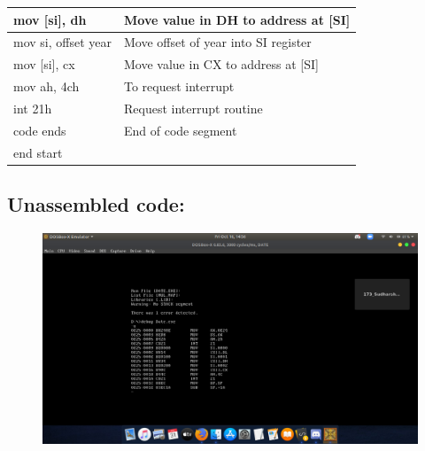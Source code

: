 \documentclass[10pt,a4paper]{article}
\begin{document}
\begin{flushleft}
\begin{table}[htb]
{\begin{tabular}{|l|l|}
\hline
mov [si], dh                                                     & Move value in DH to address at [SI]           \\
\hline
mov si, offset year                                              & Move offset of year into SI register          \\
\hline
mov [si], cx                                                     & Move value in CX to address at [SI]           \\
\hline
mov ah, 4ch                                                      & To request interrupt                          \\
\hline
int 21h                                                          & Request interrupt routine                     \\ 
\hline
code ends                                                        & End of code segment                           \\
\hline
end start                                                        &                                               \\
\hline
\end{tabular}
}
\end{table}

\newpage
\subsection*{\textbf{Unassembled code:}}
\begin{figure}[h]
    \centering
    \includegraphics[trim = 100mm 60mm 200mm 110mm, clip, width = \textwidth]{Pics/DateUS.png}
\end{figure}

\end{flushleft}
\end{document}
